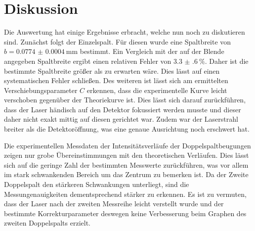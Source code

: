 
\section{Diskussion}
\label{sec:Diskussion}
Die Auswertung hat einige Ergebnisse erbracht, welche nun noch zu diskutieren
sind. Zunächst folgt der Einzelspalt. Für diesen wurde eine Spaltbreite von
$b = \SI{0.0774(4)}{\milli\meter}$ bestimmt. Ein Vergleich mit der auf
der Blende angegeben Spaltbreite ergibt einen relativen Fehler von $\SI{3.3(6)}{\percent}$.
Daher ist die bestimmte Spaltbreite größer als zu erwarten wäre. Dies lässt
 auf einen systematischen Fehler schließen. Des weiteren ist lässt sich am ermittelten
  Verschiebungsparameter $C$ erkennen, dass die experimentelle Kurve leicht
  verschoben gegenüber der Theoriekurve ist. Dies lässt sich darauf zurückführen,
  dass der Laser händisch auf den Detektor fokussiert werden musste und dieser
   daher nicht exakt mittig auf diesen gerichtet war. Zudem war der Laserstrahl breiter
    als die Detektoröffnung, was eine genaue Ausrichtung noch erschwert hat.

    Die experimentellen Messdaten der Intensitätsverläufe der Doppelspaltbeugungen
     zeigen nur grobe Übereinstimmungen mit den theoretischen Verläufen. Dies lässt
      sich auf die geringe Zahl der bestimmten Messwerte zurückführen, was
      vor allem im stark schwankenden Bereich um das Zentrum zu bemerken ist.
      Da der Zweite Doppelspalt den stärkeren Schwankungen unterliegt, sind die
       Messungenauigkeiten dementsprechend stärker zu erkennen. Es ist zu vermuten,
        dass der Laser nach der zweiten Messreihe leicht verstellt wurde und der
        bestimmte Korrekturparameter deswegen keine Verbesserung beim Graphen des zweiten Doppelspalts erzielt.
